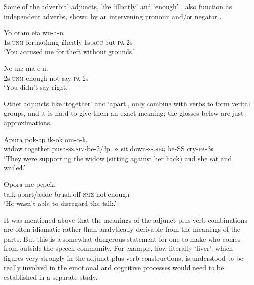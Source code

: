 Some of the adverbial adjuncts, like  `illicitly'  and  `enough' , also function as independent adverbs, shown by an intervening pronoun  and/or negator .

\ea%
\label{ex:3:x458}
\gll Yo oram  efa wu-a-n. \\
1s.\textsc{unm} for.nothing illicitly 1s.\textsc{acc} put-\textsc{pa}-2s\\
\glt`You accused me for theft without grounds.'
\z

\ea%
\label{ex:3:x459}
\gll No  me ma-e-n. \\
2s.\textsc{unm} enough not say-\textsc{pa}-2s\\
\glt`You didn't say right.'
\z

Other adjuncts like  `together' and  `apart', only combine with verbs to form verbal groups, and it is hard to give them an exact meaning; the glosses below are just approximations.

\ea%
\label{ex:3:x460}
\gll Apura   pok-ap ik-ok om-o-k.\\
widow together push-\textsc{ss}.\textsc{sim}-be-2/3p.\textsc{ds} sit.down-\textsc{ss}.\textsc{seq} be-SS cry-\textsc{pa}-3s\\
\glt`They were supporting the widow (sitting against her back) and she sat and wailed.'
\z

\ea%
\label{ex:3:x461}
\gll Opora   me pepek. \\
talk apart/aside brush.off-\textsc{nmz} not enough \\
\glt`He wasn't able to disregard the talk.'
\z

It was mentioned above that the meanings of the adjunct plus verb combinations are often idiomatic rather than analytically derivable from the meanings of the parts. But this is a somewhat dangerous statement for one to make who comes from outside the speech community. For example, how literally  `liver', which figures very strongly in the adjunct plus verb constructions, is understood to be really involved in the emotional and cognitive processes would need to be established in a separate study.

